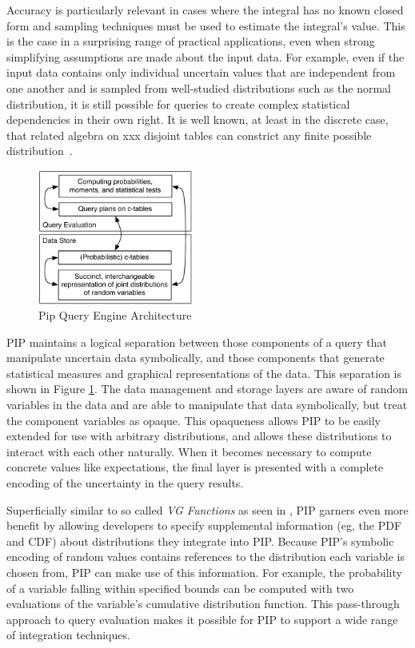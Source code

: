 Accuracy is particularly relevant in cases where the integral has no known closed form and sampling techniques must be used to estimate the integral's value.  This is the case in a surprising range of practical applications, even when strong simplifying assumptions are made about the input data.  For example, even if the input data contains only individual uncertain values that are independent from one another and is sampled from well-studied distributions such as the normal distribution, it is still possible for queries to create complex statistical dependencies in their own right.  It is well known, at least in the discrete case, that related algebra on xxx disjoint tables can constrict any finite possible distribution\ \cite{1325861,IL1984}.

%
\begin{figure}
\begin{center}
\includegraphics[width=2in]{graphics/arch.pdf}
\caption{Pip Query Engine Architecture}
\label{fig:arch}
\end{center}
\end{figure}

PIP maintains a logical separation between those components of a query that manipulate uncertain data symbolically, and those components that generate statistical measures and graphical representations of the data.  This separation is shown in Figure \ref{fig:arch}.  The data management and storage layers are aware of random variables in the data and are able to manipulate that data symbolically, but treat the component variables as opaque.  This opaqueness allows PIP to be easily extended for use with arbitrary distributions, and allows these distributions to interact with each other naturally.  When it becomes necessary to compute concrete values like expectations, the final layer is presented with a complete encoding of the uncertainty in the query results.  

Superficially similar to so called {\em VG Functions} as seen in \cite{MCDB}, PIP garners even more benefit by allowing developers to specify supplemental information (eg, the PDF and CDF) about distributions they integrate into PIP.  Because PIP's symbolic encoding of random values contains references to the distribution each variable is chosen from, PIP can make use of this information.  For example, the probability of a variable falling within specified bounds can be computed with two evaluations of the variable's cumulative distribution function.  This pass-through approach to query evaluation makes it possible for PIP to support a wide range of integration techniques.


